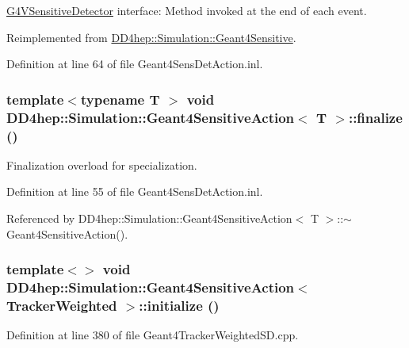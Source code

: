 \hyperlink{class_g4_v_sensitive_detector}{G4VSensitiveDetector} interface: Method invoked at the end of each event. 

Reimplemented from \hyperlink{class_d_d4hep_1_1_simulation_1_1_geant4_sensitive_abcce05101539a9941c06aada4625a608}{DD4hep::Simulation::Geant4Sensitive}.

Definition at line 64 of file Geant4SensDetAction.inl.\hypertarget{class_d_d4hep_1_1_simulation_1_1_geant4_sensitive_action_acf98c9d63c8703544da1e68b6c1abeae}{
\subsubsection[{finalize}]{\setlength{\rightskip}{0pt plus 5cm}template$<$typename T $>$ void {\bf DD4hep::Simulation::Geant4SensitiveAction}$<$ T $>$::finalize ()}}
\label{class_d_d4hep_1_1_simulation_1_1_geant4_sensitive_action_acf98c9d63c8703544da1e68b6c1abeae}


Finalization overload for specialization. 

Definition at line 55 of file Geant4SensDetAction.inl.

Referenced by DD4hep::Simulation::Geant4SensitiveAction$<$ T $>$::$\sim$Geant4SensitiveAction().\hypertarget{class_d_d4hep_1_1_simulation_1_1_geant4_sensitive_action_a07c8ad40e9cae09940a0397c091c2f45}{
\subsubsection[{initialize}]{\setlength{\rightskip}{0pt plus 5cm}template$<$$>$ void {\bf DD4hep::Simulation::Geant4SensitiveAction}$<$ {\bf TrackerWeighted} $>$::initialize ()}}
\label{class_d_d4hep_1_1_simulation_1_1_geant4_sensitive_action_a07c8ad40e9cae09940a0397c091c2f45}


Definition at line 380 of file Geant4TrackerWeightedSD.cpp.

